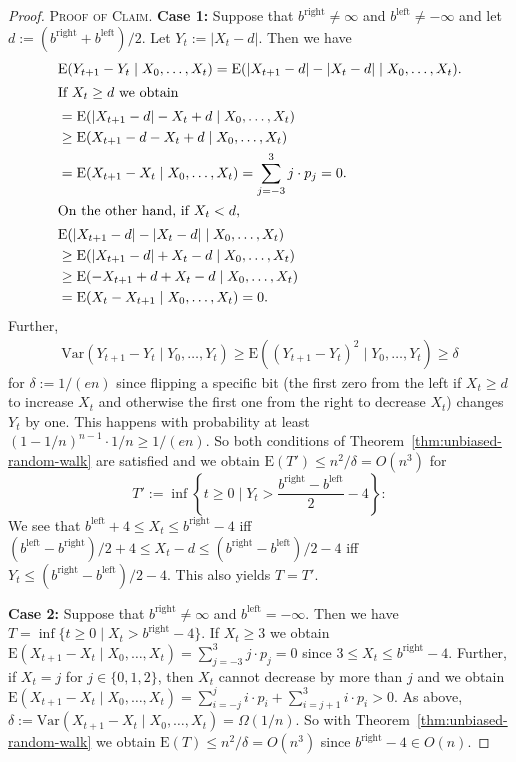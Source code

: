 \documentclass[
sigconf = false, %
review = false, %
screen = true, %
anonymous = true, %
format=acmsmall
]{acmart}
\newcommand*{\E}{\mathrm{E}}
\newenvironment{proofofclaim}{\textsc{Proof of Claim.}}{\hfill\scriptsize\scalebox{1}{$\blacksquare$}}
\begin{document}
\begin{proof}
\begin{proofofclaim}
    \textbf{Case 1:} Suppose that $b^{\text{right}} \neq \infty$ and $b^{\text{left}} \neq -\infty$ and let $d:=(b^{\text{right}}+b^{\text{left}})/2$. Let $Y_t:=|X_t-d|$. Then we have
    \begin{align*}
    &\E(Y_{t+1}-Y_t \mid X_0, \ldots , X_t) = \E(|X_{t+1}-d|-|X_t-d| \mid X_0, \ldots , X_t).\\
    \intertext{If $X_t \geq d$ we obtain}
    &= \E(|X_{t+1}-d|-X_t+d \mid X_0, \ldots , X_t)\\
    &\geq \E(X_{t+1}-d-X_t+d \mid X_0, \ldots , X_t) \\
    &= \E(X_{t+1}-X_t \mid X_0, \ldots , X_t)  = \sum_{j=-3}^3 j \cdot p_j = 0.\\
    \intertext{On the other hand, if $X_t < d$,}
    & \E(|X_{t+1}-d|-|X_t-d| \mid X_0, \ldots , X_t) \\ 
    &\geq \E(|X_{t+1}-d| +X_t-d \mid X_0, \ldots , X_t)\\
    & \geq \E(-X_{t+1}+d +X_t-d \mid X_0, \ldots , X_t) \\
    &= \E(X_t-X_{t+1} \mid X_0, \ldots , X_t) = 0.
    \end{align*}
    Further, 
    \begin{align*}
    \text{Var}(Y_{t+1}-Y_t \mid Y_0, \ldots , Y_t) \geq \E((Y_{t+1}-Y_t)^2 \mid Y_0, \ldots , Y_t) \geq \delta
    \end{align*}
    for $\delta:= 1/(en)$ since flipping a specific bit (the first zero from the left if $X_t \geq d$ to increase $X_t$ and otherwise the first one from the right to decrease $X_t$) changes $Y_t$ by one. This happens with probability at least $(1-1/n)^{n-1} \cdot 1/n \geq 1/(en)$. So both conditions of Theorem~\ref{thm:unbiased-random-walk} are satisfied and we obtain $\E(T') \leq n^2/\delta = O(n^3)$ for 
    $$T':=\inf \left\{t \geq 0 \mid Y_t > \frac{b^{\text{right}}-b^{\text{left}}}{2} - 4 \right\}:$$
    We see that $b^{\text{left}}+4 \leq X_t \leq b^{\text{right}}-4$ iff $(b^{\text{left}}-b^{\text{right}})/2+4 \leq X_t - d \leq (b^{\text{right}}-b^{\text{left}})/2-4$ iff $Y_t \leq (b^{\text{right}}-b^{\text{left}})/2-4$. This also yields $T=T'$.  

    \textbf{Case 2:} Suppose that $b^{\text{right}} \neq \infty$ and $b^{\text{left}} = -\infty$. Then we have $T= \inf\{t \geq 0 \mid X_t > b^{\text{right}} - 4\}$. If $X_t \geq 3$ we obtain $\E(X_{t+1}-X_t \mid X_0, \ldots , X_t) = \sum_{j=-3}^3 j \cdot p_j = 0$ since $3 \leq X_t \leq b^{\text{right}}-4$. Further, if $X_t = j$ for $j \in \{0,1,2\}$, then $X_t$ cannot decrease by more than $j$ and we obtain
    $\E(X_{t+1}-X_t \mid X_0, \ldots , X_t) = \sum_{i=-j}^j i \cdot p_i + \sum_{i=j+1}^3 i \cdot p_i > 0.$
    As above, $\delta:=\text{Var}(X_{t+1}-X_t \mid X_0, \ldots , X_t) = \Omega(1/n)$. So with Theorem~\ref{thm:unbiased-random-walk} we obtain $\E(T) \leq n^2/\delta = O(n^3)$
    since $b^{\text{right}}-4 \in O(n)$.


\end{proofofclaim}
\end{proof}
\end{document}

